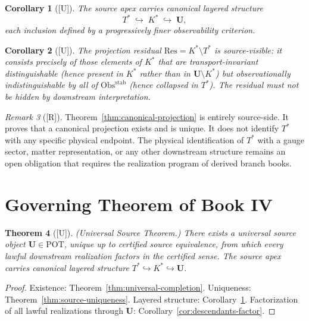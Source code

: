 \documentclass[12pt,oneside]{amsbook}
\theoremstyle{plain}
\newtheorem{theorem}{Theorem}[section]
\newtheorem{corollary}[theorem]{Corollary}
\theoremstyle{definition}
\theoremstyle{remark}
\newtheorem{remark}[theorem]{Remark}
\newcommand{\status}[1]{\textup{[#1]}}
\begin{document}
\begin{corollary}[\status{U}]\label{cor:layered-structure}
The source apex carries canonical layered structure
\[
  T^* \;\hookrightarrow\; K^* \;\hookrightarrow\; \mathbf{U},
\]
each inclusion defined by a progressively finer observability
criterion.
\end{corollary}

\begin{corollary}[\status{U}]\label{cor:residual-visible}
The projection residual $\mathrm{Res} = K^* \setminus T^*$ is
source-visible: it consists precisely of those elements of $K^*$ that
are transport-invariant distinguishable (hence present in $K^*$ rather
than in $\mathbf{U} \setminus K^*$) but observationally
indistinguishable by all of $\mathrm{Obs}^{\mathrm{stab}}$ (hence
collapsed in $T^*$).  The residual must not be hidden by downstream
interpretation.
\end{corollary}

\begin{remark}[\status{R}]\label{rmk:projection-source-side}
Theorem~\ref{thm:canonical-projection} is entirely source-side.  It
proves that a canonical projection exists and is unique.  It does not
identify $T^*$ with any specific physical endpoint.  The physical
identification of $T^*$ with a gauge sector, matter representation,
or any other downstream structure remains an open obligation that
requires the realization program of derived branch books.
\end{remark}

\section{Governing Theorem of Book IV}

\begin{theorem}[\status{U}]\label{thm:governing}
\textup{(Universal Source Theorem.)}  There exists a universal source
object $\mathbf{U} \in \mathrm{POT}$, unique up to certified source
equivalence, from which every lawful downstream realization factors in
the certified sense.  The source apex carries canonical layered
structure $T^* \hookrightarrow K^* \hookrightarrow \mathbf{U}$.
\end{theorem}

\begin{proof}
Existence: Theorem~\ref{thm:universal-completion}.
Uniqueness: Theorem~\ref{thm:source-uniqueness}.
Layered structure: Corollary~\ref{cor:layered-structure}.
Factorization of all lawful realizations through $\mathbf{U}$:
Corollary~\ref{cor:descendants-factor}.
\end{proof}
\end{document}
